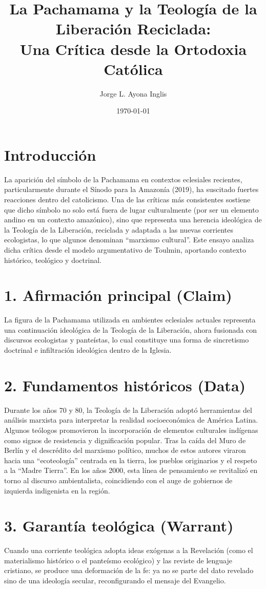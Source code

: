 \documentclass[12pt]{article}
\title{La Pachamama y la Teología de la Liberación Reciclada:\\Una Crítica desde la Ortodoxia Católica}
\author{Jorge L. Ayona Inglis}
\date{\today}
\begin{document}
\maketitle
\onehalfspacing

\section*{Introducción}
La aparición del símbolo de la Pachamama en contextos eclesiales recientes, particularmente durante el Sínodo para la Amazonía (2019), ha suscitado fuertes reacciones dentro del catolicismo. Una de las críticas más consistentes sostiene que dicho símbolo no solo está fuera de lugar culturalmente (por ser un elemento andino en un contexto amazónico), sino que representa una herencia ideológica de la Teología de la Liberación, reciclada y adaptada a las nuevas corrientes ecologistas, lo que algunos denominan “marxismo cultural”. Este ensayo analiza dicha crítica desde el modelo argumentativo de Toulmin, aportando contexto histórico, teológico y doctrinal.

\section*{1. Afirmación principal (Claim)}
La figura de la Pachamama utilizada en ambientes eclesiales actuales representa una continuación ideológica de la Teología de la Liberación, ahora fusionada con discursos ecologistas y panteístas, lo cual constituye una forma de sincretismo doctrinal e infiltración ideológica dentro de la Iglesia.

\section*{2. Fundamentos históricos (Data)}
Durante los años 70 y 80, la Teología de la Liberación adoptó herramientas del análisis marxista para interpretar la realidad socioeconómica de América Latina. Algunos teólogos promovieron la incorporación de elementos culturales indígenas como signos de resistencia y dignificación popular. Tras la caída del Muro de Berlín y el descrédito del marxismo político, muchos de estos autores viraron hacia una “ecoteología” centrada en la tierra, los pueblos originarios y el respeto a la “Madre Tierra”. En los años 2000, esta línea de pensamiento se revitalizó en torno al discurso ambientalista, coincidiendo con el auge de gobiernos de izquierda indigenista en la región.

\section*{3. Garantía teológica (Warrant)}
Cuando una corriente teológica adopta ideas exógenas a la Revelación (como el materialismo histórico o el panteísmo ecológico) y las reviste de lenguaje cristiano, se produce una deformación de la fe: ya no se parte del dato revelado sino de una ideología secular, reconfigurando el mensaje del Evangelio.
\end{document}
